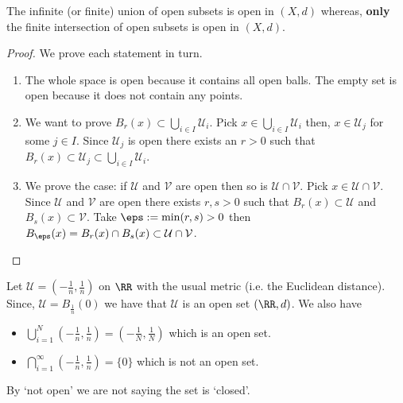 \documentclass[12pt, a4paper]{article}
\begin{document}
\begin{mdnote}
    The infinite (or finite) union of open subsets is open in \((X,d)\) whereas, \textbf{only} the finite intersection of open subsets is open in \((X,d)\).
\end{mdnote}

\begin{proof}
    We prove each statement in turn.
    \begin{enumerate}
        \item The whole space is open because it contains all open balls. The empty set is open because it does not contain any points.
        \item We want to prove \(B_r(x) \subset \bigcup_{i \in I} \mathcal{U}_i\). Pick \(x \in \bigcup_{i \in I} \mathcal{U}_i\) then, \(x \in \mathcal{U}_j\) for some \(j \in I\). Since \(\mathcal{U}_j\) is open there exists an \(r>0\) such  that \(B_r(x) \subset \mathcal{U}_j \subset \bigcup_{i \in I} \mathcal{U}_i\).
        \item We prove the case: if \(\mathcal{U}\) and \(\mathcal{V}\) are open then so is \(\mathcal{U} \cap \mathcal{V}\). Pick \(x \in \mathcal{U} \cap \mathcal{V}\). Since \(\mathcal{U}\) and \(\mathcal{V}\) are open there exists \(r,s>0\) such that \(B_r(x) \subset \mathcal{U}\) and \(B_s(x) \subset \mathcal{V}\). Take \(\eps:= \min(r,s)>0\) then \(B_{\eps}(x) = B_r(x) \cap B_s(x) \subset \mathcal{U} \cap \mathcal{V}\).
    \end{enumerate}
\end{proof}

\begin{example}
    Let \(\mathcal{U}= \left( -\frac{1}{n},\frac{1}{n} \right)\) on \(\RR\) with the usual metric (i.e. the Euclidean distance). Since, \(\mathcal{U}=B_{\frac{1}{n}}(0)\) we have that \(\mathcal{U}\) is an open set \((\RR,d)\). We also have
    \begin{itemize}
        \item \(\bigcup_{i=1}^N \left( -\frac{1}{n},\frac{1}{n} \right) = \left( -\frac{1}{N}, \frac{1}{N} \right)\) which is an open set.
        \item \(\bigcap_{i=1}^{\infty} \left( -\frac{1}{n},\frac{1}{n} \right)= \{0\}\) which is not an open set.
    \end{itemize}
\end{example}

\begin{mdremark}
    By `not open' we are not saying the set is `closed'. 
\end{mdremark}
\end{document}
